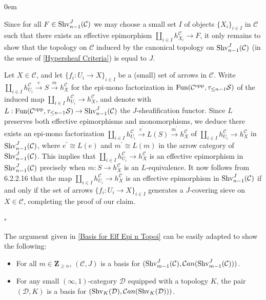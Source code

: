 \documentclass[10pt]{article}
\newcommand{\mS}{\mathcal S}
\newcommand{\C}{\mathcal C}
\newcommand{\cD}{\mathcal{D}}
\newcommand{\ZZ}{\mathbb{Z}}
\def\ZZ{{\mathbf Z}}
\renewcommand{\qed}{\hfill$\square$}
\renewenvironment{proof}{\begin{addmargin}[1em]{0em}\begin{newproof}}{\end{newproof}\end{addmargin}\qed}
\theoremstyle{witharg}
\theoremstyle{witharg}
\theoremstyle{witharg2}
\begin{document}
\begin{proof}

    Since for all $F\in \textnormal{Shv}^J_{n-1}(\C)$ we may choose a small set $I$ of objects $\{X_i\}_{i\in I}$ in $\C$ such that there exists an effective epimorphism $\coprod_{i\in I}h^\C_{X_i}\rightarrow F$, it only remains to show that the topology on $\C$ induced by the canonical topology on $\textnormal{Shv}^J_{n-1}(\C)$ (in the sense of \ref{Hypersheaf Criteria}) is equal to $J$.  

    Let $X\in \C$, and let $\{f_i:U_i\rightarrow X\}_{i\in I}$ be a (small) set of arrows in $\C$. Write $\coprod_{i\in I}h^\C_{U_i}\xrightarrow{e} S\xrightarrow{m} h^\C_X$ for the epi-mono factorization in $\textnormal{Fun}(\C^{\textnormal{opp}},\tau_{\leq n-1}\mS)$ of the induced map $\coprod_{i\in I}h^\C_{U_i}\rightarrow h^\C_X$, and denote with $L:\textnormal{Fun}(\C^{\textnormal{opp}},\tau_{\leq n-1}\mS)\rightarrow \textnormal{Shv}_{n-1}^J(\C)$ the $J$-sheafification functor. Since $L$ preserves both effective epimorphisms and monomorphisms, we deduce there exists an epi-mono factorization $\coprod_{i\in I}h^\C_{U_i}\xrightarrow{e^\prime} L(S)\xrightarrow{m^\prime} h^\C_X$ of $\coprod_{i\in I}h^\C_{U_i} \rightarrow h^\C_X$ in $\textnormal{Shv}_{n-1}^J(\C)$, where $e^\prime\cong L(e)$ and $m^\prime\cong L(m)$ in the arrow category of $\textnormal{Shv}_{n-1}^J(\C)$. This implies that $\coprod_{i\in I}h^\C_{U_i} \rightarrow h^\C_X$ is an effective epimorphism in $\textnormal{Shv}_{n-1}^J(\C)$ precisely when $m:S\rightarrow h^\C_X$ is an $L$-equivalence. It now follows from  6.2.2.16 that the map $\coprod_{i\in I}h^\C_{U_i}\rightarrow  h^\C_X$ is an effective epimorphism in $\textnormal{Shv}_{n-1}^J(\C)$ if and only if the set of arrows $\{f_i:U_i\rightarrow X\}_{i\in I}$ generates a $J$-covering sieve on $X\in \C$, completing the proof of our claim. 

    
\end{proof}


\begin{remark}{}\label{Generalization of Basis for Eff Epi n Topoi}

    The argument given in \ref{Basis for Eff Epi n Topoi} can be easily adapted to show the following:

    \begin{itemize}
        \item [\textnormal{(i)}] For all $m\in \ZZ_{\geq n}$, $(\C,J)$ is a basis for $(\textnormal{Shv}_{m-1}^J(\C),\C an(\textnormal{Shv}_{m-1}^J(\C)))$. 

        \item [\textnormal{(ii)}] For any small $(\infty,1)$-category $\cD$ equipped with a topology $K$, the pair $(\cD,K)$ is a basis for $(\textnormal{Shv}_K(\cD),\C an(\textnormal{Shv}_K(\cD)))$.

        
    \end{itemize}
    
\end{remark}
\end{document}
